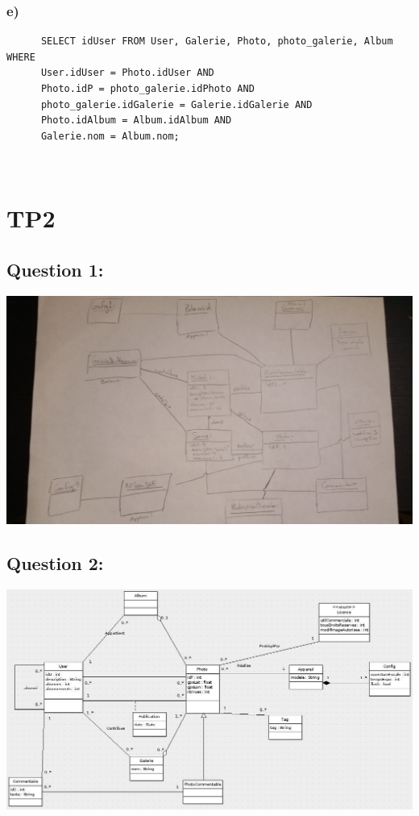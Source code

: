\documentclass[10pt]{article}
\newenvironment{DDbox}[1]{
\begin{lrbox}{\BBbox}\begin{minipage}{\linewidth}}
{\end{minipage}\end{lrbox}\noindent\colorbox{white}{\usebox{\BBbox}} \\
[.5cm]}
\begin{document}
  \subsubsection{ e)}
  \begin{DDbox}{0.4}
    \begin{lstlisting}
      SELECT idUser FROM User, Galerie, Photo, photo_galerie, Album WHERE
      User.idUser = Photo.idUser AND
      Photo.idP = photo_galerie.idPhoto AND
      photo_galerie.idGalerie = Galerie.idGalerie AND
      Photo.idAlbum = Album.idAlbum AND
      Galerie.nom = Album.nom;
    \end{lstlisting}
  \end{DDbox}
\section{TP2}
  \subsection {Question 1:}
    \includegraphics[scale=0.25]{instanciation.jpg}
  \subsection{Question 2:}
    \includegraphics[scale=0.4]{umlTP1-2.png}
    \newpage
\end{document}
